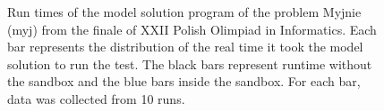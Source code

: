 \documentclass[en]{pracamgr}
\begin{document}
\begin{appendices}
\begin{figure}[H]
\caption{Run times of the model solution program of the problem Myjnie (myj) from the finale of XXII Polish Olimpiad in Informatics. Each bar represents the distribution of the real time it took the model solution to run the test. The black bars represent runtime without the sandbox and the blue bars inside the sandbox. For each bar, data was collected from 10 runs.}
\label{figure:myj_model_solution_real_time}
\end{figure}


\end{appendices}
\end{document}
